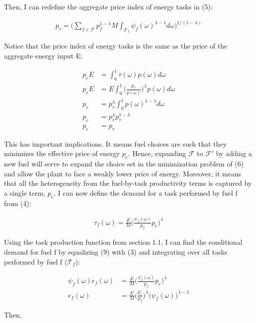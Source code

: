 \documentclass{article}
\begin{document}
Then, I can redefine the aggregate price index of energy tasks in (5):

\begin{align}
    p_{\tau} = \Bigg( \sum_{f \in \mathcal{F}} p_f^{1-\lambda} M \int_{\mathcal{T}_f} \psi_f(\omega)^{\lambda-1} d\omega \Bigg)^{1/(1-\lambda)}
\end{align}

Notice that the price index of energy tasks is the same as the price of the aggregate energy input E:

\begin{align*}
    p_e E &= \int_0^1 \tau(\omega) p(\omega) d\omega \\
    p_e E &= E \int_0^1 \Big( \frac{p_{\tau}}{p(\omega)} \Big)^{\lambda} p(\omega) d\omega \\
    p_e &= p_{\tau}^{\lambda} \int_0^1 p(\omega)^{1-\lambda} d\omega \\
    p_e &= p_{\tau}^{\lambda} p_{\tau}^{1-\lambda} \\
    p_e &= p_{\tau}
\end{align*}

This has important implications. It means fuel choices are such that they minimizes the effective price of energy $p_e$. Hence, expanding $\mathcal{F}$ to $\mathcal{F'}$ by adding a new fuel will serve to expand the choice set in the minimization problem of (6) and allow the plant to face a weakly lower price of energy. Moreover, it means that all the heterogeneity from the fuel-by-task productivity terms is captured by a single term, $p_e$. I can now define the demand for a task performed by fuel f from (4):

\begin{align}
    \tau_f(\omega) = \frac{E}{M} \Big( \frac{ \psi_f(\omega)}{p_f} p_e \Big)^{\lambda}
\end{align}

Using the task production function from section 1.1, I can find the conditional demand for fuel f by equalizing (9) with (3) and integrating over all tasks performed by fuel f ($\mathcal{T}_f$):

\begin{align*}
     \psi_f(\omega) e_f(\omega) &= \frac{E}{M} \Big( \frac{ \psi_f(\omega)}{p_f} p_e \Big)^{\lambda} \\
    e_f(\omega) &= \frac{E}{M} \Big( \frac{p_e}{p_f} \Big)^{\lambda} \big(\psi_f(\omega) \big)^{\lambda-1}
\end{align*}

Then,
\end{document}

